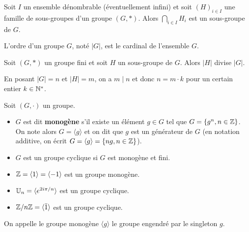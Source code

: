 \documentclass[11pt,a4paper]{report}
\begin{document}
\begin{property}
    Soit $I$ un ensemble dénombrable (éventuellement infini) et soit $(H)_{i \in I}$ une famille de sous-groupes d'un groupe $(G,*)$. Alors $\bigcap_{i \in I} H_i$ est un sous-groupe de $G$.
\end{property}

\begin{definition}
    L'ordre d'un groupe $G$, noté $|G|$, est le cardinal de l'ensemble $G$.
\end{definition}

\begin{theorem}
    Soit $(G,*)$ un groupe fini et soit $H$ un sous-groupe de $G$. Alors $|H|$ divise $|G|$.

    En posant $|G| = n$ et $|H| = m$, on a $m \mid n$ et donc $n = m \cdot k$ pour un certain entier $k \in \mathbb{N}^*$.
\end{theorem}

\begin{definition}
    Soit $(G,\cdot)$ un groupe.
    \begin{itemize}
        \item $G$ est dit \textbf{monogène} s'il existe un élément $g \in G$ tel que $G = \{ g^n, n \in \mathbb{Z} \}$. On note alors $G = \langle g \rangle$ et on dit que $g$ est un générateur de $G$ (en notation additive, on écrit $G = \langle g \rangle = \{ n g, n \in \mathbb{Z} \}$).
        \item $G$ est un groupe cyclique si $G$ est monogène et fini.
    \end{itemize}
\end{definition}

\begin{example}
    \begin{itemize}
        \item $\mathbb{Z} = \langle 1 \rangle = \langle -1 \rangle$ est un groupe monogène.
        \item $\mathbb{U}_n = \langle e^{2 i \pi / n} \rangle$ est un groupe cyclique.
        \item $\mathbb{Z}/n\mathbb{Z} = \langle \bar 1 \rangle$ est un groupe cyclique.
    \end{itemize}
\end{example}

\begin{definition}
    On appelle le groupe monogène $\langle g \rangle$ le groupe engendré par le singleton $g$.
\end{definition}
\end{document}
